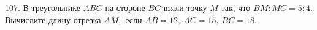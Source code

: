 107. В треугольнике $ABC$ на стороне $BC$ взяли точку $M$ так, что $BM:MC=5:4.$ Вычислите длину отрезка $AM,$ если $AB=12,\ AC=15,\ BC=18.$\\
